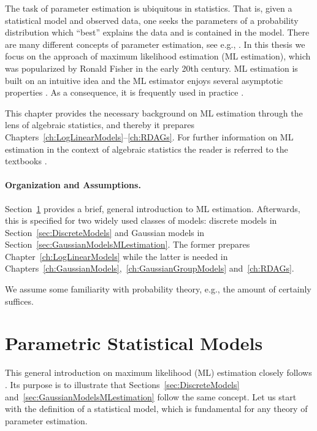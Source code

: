 


The task of parameter estimation is ubiquitous in statistics. That is, given a statistical model and observed data, one seeks the parameters of a probability distribution which ``best'' explains the data and is contained in the model.
There are many different concepts of parameter estimation, see e.g., \cite{JaynesBook, LehmannCasellaBook, rice2006mathematical}.
In this thesis we focus on the approach of maximum likelihood estimation  (ML estimation), which was popularized by Ronald Fisher in the early 20th century. ML estimation is built on an intuitive idea and the ML estimator enjoys several asymptotic properties \cite{CramerMathematical, AsymptoticStatistics}.
As a consequence, it is frequently used in practice \cite{CramerEconometric, MillarBook, SeveriniBook, WardBook}.

This chapter provides the necessary background on ML estimation through the lens of algebraic statistics, and thereby it prepares Chapters~\ref{ch:LogLinearModels}--\ref{ch:RDAGs}.
For further information on ML estimation in the context of algebraic statistics the reader is referred to the textbooks \cite{LecturesAlgebraicStatistics, ASCB, SullivantBook}.

\paragraph{Organization and Assumptions.}
Section~\ref{sec:ParametricStatisticalModels} provides a brief, general introduction to ML estimation. Afterwards, this is specified for two widely used classes of models: discrete models in Section~\ref{sec:DiscreteModels} and Gaussian models in Section~\ref{sec:GaussianModelsMLestimation}. The former prepares Chapter~\ref{ch:LogLinearModels} while the latter is needed in Chapters~\ref{ch:GaussianModels},~\ref{ch:GaussianGroupModels} and~\ref{ch:RDAGs}.

We assume some familiarity with probability theory, e.g., the amount of \cite[Chapter~2]{SullivantBook} certainly suffices.




\section{Parametric Statistical Models}\label{sec:ParametricStatisticalModels}

This general introduction on maximum likelihood (ML) estimation closely follows \cite[Chapter~5]{SullivantBook}.
Its purpose is to illustrate that Sections~\ref{sec:DiscreteModels} and~\ref{sec:GaussianModelsMLestimation} follow the same concept. Let us start with the definition of a statistical model, which is fundamental for any theory of parameter estimation.


